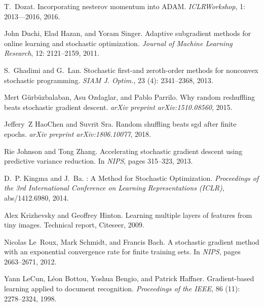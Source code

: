 \begin{thebibliography}{42}
T.~Dozat.
\newblock Incorporating nesterov momentum into {ADAM}.
\newblock \emph{ICLRWorkshop}, 1: 2013–--2016, 2016.

John Duchi, Elad Hazan, and Yoram Singer.
\newblock Adaptive subgradient methods for online learning and stochastic
  optimization.
\newblock \emph{Journal of Machine Learning Research}, 12: 2121--2159,
  2011.

S.~Ghadimi and G.~Lan.
\newblock Stochastic first-and zeroth-order methods for nonconvex stochastic
  programming.
\newblock \emph{SIAM J. Optim.}, 23 (4): 2341--2368, 2013.

Mert G{\"u}rb{\"u}zbalaban, Asu Ozdaglar, and Pablo Parrilo.
\newblock Why random reshuffling beats stochastic gradient descent.
\newblock \emph{arXiv preprint arXiv:1510.08560}, 2015.

Jeffery~Z HaoChen and Suvrit Sra.
\newblock Random shuffling beats sgd after finite epochs.
\newblock \emph{arXiv preprint arXiv:1806.10077}, 2018.

Rie Johnson and Tong Zhang.
\newblock Accelerating stochastic gradient descent using predictive variance
  reduction.
\newblock In \emph{NIPS}, pages 315--323, 2013.

D.~P. Kingma and J.~Ba.
: {A} {M}ethod for {S}tochastic {O}ptimization.
\newblock \emph{Proceedings of the 3rd International Conference on Learning
  Representations (ICLR)}, abs/1412.6980, 2014.

Alex Krizhevsky and Geoffrey Hinton.
\newblock Learning multiple layers of features from tiny images.
\newblock Technical report, Citeseer, 2009.

Nicolas Le~Roux, Mark Schmidt, and Francis Bach.
\newblock A stochastic gradient method with an exponential convergence rate for
  finite training sets.
\newblock In \emph{NIPS}, pages 2663--2671, 2012.

Yann LeCun, L{\'e}on Bottou, Yoshua Bengio, and Patrick Haffner.
\newblock Gradient-based learning applied to document recognition.
\newblock \emph{Proceedings of the IEEE}, 86 (11):
  2278--2324, 1998.


\end{thebibliography}
